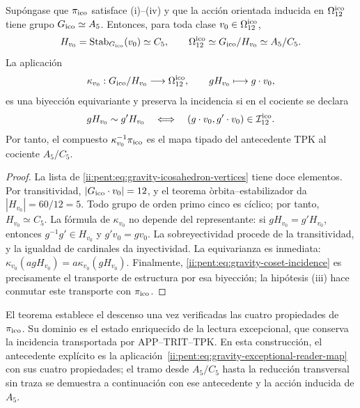 


\begin{theorem}
\label{ii:pent:thm:gravity-exceptional-descent}
Sup\'ongase que \(\pi_{\rm ico}\) satisface (i)--(iv) y que la acci\'on
orientada inducida en \(\Omega_{12}^{\rm ico}\) tiene grupo
\(G_{\rm ico}\simeq A_5\). Entonces, para toda clase
\(v_0\in\Omega_{12}^{\rm ico}\),
\begin{equation}
\label{ii:pent:eq:gravity-icosahedral-quotient}
H_{v_0}=\operatorname{Stab}_{G_{\rm ico}}(v_0)\simeq C_5,
\qquad
\Omega_{12}^{\rm ico}\simeq G_{\rm ico}/H_{v_0}\simeq A_5/C_5.
\end{equation}
La aplicaci\'on
\begin{equation}
\label{ii:pent:eq:gravity-coset-map}
\kappa_{v_0}:G_{\rm ico}/H_{v_0}\longrightarrow\Omega_{12}^{\rm ico},
\qquad gH_{v_0}\longmapsto g\cdot v_0,
\end{equation}
es una biyecci\'on equivariante y preserva la incidencia si en el cociente
se declara
\begin{equation}
\label{ii:pent:eq:gravity-coset-incidence}
gH_{v_0}\sim g'H_{v_0}
\quad\Longleftrightarrow\quad
(g\cdot v_0,g'\cdot v_0)\in\mathcal I_{12}^{\rm ico}.
\end{equation}
Por tanto, el compuesto \(\kappa_{v_0}^{-1}\pi_{\rm ico}\) es el mapa
tipado del antecedente TPK al cociente \(A_5/C_5\).
\end{theorem}

\begin{proof}
La lista de \eqref{ii:pent:eq:gravity-icosahedron-vertices} tiene doce elementos.
Por transitividad, \(|G_{\rm ico}\cdot v_0|=12\), y el teorema
\`orbita--estabilizador da \(|H_{v_0}|=60/12=5\). Todo grupo de orden
primo cinco es c\'iclico; por tanto, \(H_{v_0}\simeq C_5\). La f\'ormula de
\(\kappa_{v_0}\) no depende del representante: si
\(gH_{v_0}=g'H_{v_0}\), entonces \(g^{-1}g'\in H_{v_0}\) y
\(g'v_0=gv_0\). La sobreyectividad procede de la transitividad, y la
igualdad de cardinales da inyectividad. La equivarianza es inmediata:
\(\kappa_{v_0}(agH_{v_0})=a\kappa_{v_0}(gH_{v_0})\). Finalmente,
\eqref{ii:pent:eq:gravity-coset-incidence} es precisamente el transporte de
estructura por esa biyecci\'on; la hip\'otesis (iii) hace conmutar este
transporte con \(\pi_{\rm ico}\).
\end{proof}

El teorema establece el descenso una vez verificadas las cuatro
propiedades de \(\pi_{\rm ico}\). Su dominio es el estado enriquecido
de la lectura excepcional, que conserva la incidencia transportada por
APP--TRIT--TPK. En esta construcción, el antecedente explícito es la
aplicación~\eqref{ii:pent:eq:gravity-exceptional-reader-map} con sus cuatro
propiedades; el tramo desde \(A_5/C_5\) hasta la reducción transversal sin
traza se demuestra a continuación con ese antecedente y la acción inducida
de \(A_5\).

